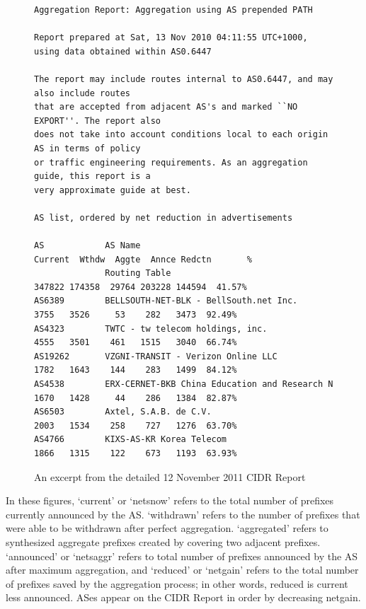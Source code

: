 \begin{figure}
\begin{lstlisting}[frame=trlb]
Aggregation Report: Aggregation using AS prepended PATH

Report prepared at Sat, 13 Nov 2010 04:11:55 UTC+1000, using data obtained within AS0.6447

The report may include routes internal to AS0.6447, and may also include routes
that are accepted from adjacent AS's and marked ``NO EXPORT''. The report also
does not take into account conditions local to each origin AS in terms of policy
or traffic engineering requirements. As an aggregation guide, this report is a
very approximate guide at best.

AS list, ordered by net reduction in advertisements

AS            AS Name                                      Current  Wthdw  Aggte  Annce Redctn       %
              Routing Table                                 347822 174358  29764 203228 144594  41.57%
AS6389        BELLSOUTH-NET-BLK - BellSouth.net Inc.          3755   3526     53    282   3473  92.49%
AS4323        TWTC - tw telecom holdings, inc.                4555   3501    461   1515   3040  66.74%
AS19262       VZGNI-TRANSIT - Verizon Online LLC              1782   1643    144    283   1499  84.12%
AS4538        ERX-CERNET-BKB China Education and Research N   1670   1428     44    286   1384  82.87%
AS6503        Axtel, S.A.B. de C.V.                           2003   1534    258    727   1276  63.70%
AS4766        KIXS-AS-KR Korea Telecom                        1866   1315    122    673   1193  63.93%
\end{lstlisting}
\caption{An excerpt from the detailed 12 November 2011 CIDR Report}
\label{fig:ex_cidr_report_detail}
\end{figure}

In these figures, `current' or `netsnow' refers to the total number of prefixes
currently announced by the AS. `withdrawn' refers to the number of prefixes
that were able to be withdrawn after perfect aggregation. `aggregated' refers
to synthesized aggregate prefixes created by covering two adjacent prefixes.
`announced' or `netsaggr' refers to total number of prefixes announced by the
AS after maximum aggregation, and `reduced' or `netgain' refers to the total
number of prefixes saved by the aggregation process; in other words, reduced is
current less announced. ASes appear on the CIDR Report in order by decreasing
netgain.

